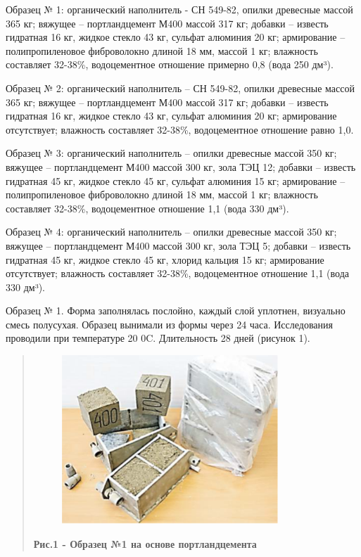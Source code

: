 Образец № 1: органический наполнитель - СН 549-82, опилки древесные
массой 365 кг; вяжущее -- портландцемент М400 массой 317 кг; добавки --
известь гидратная 16 кг, жидкое стекло 43 кг, сульфат алюминия 20 кг;
армирование -- полипропиленовое фиброволокно длиной 18 мм, массой 1 кг;
влажность составляет 32-38\%, водоцементное отношение примерно 0,8 (вода
250 дм³).

Образец № 2: органический наполнитель -- СН 549-82, опилки древесные
массой 365 кг; вяжущее -- портландцемент М400 массой 317 кг; добавки --
известь гидратная 16 кг, жидкое стекло 43 кг, сульфат алюминия 20 кг;
армирование отсутствует; влажность составляет 32-38\%, водоцементное
отношение равно 1,0.

Образец № 3: органический наполнитель -- опилки древесные массой 350 кг;
вяжущее -- портландцемент М400 массой 300 кг, зола ТЭЦ 12; добавки --
известь гидратная 45 кг, жидкое стекло 45 кг, сульфат алюминия 15 кг;
армирование -- полипропиленовое фиброволокно длиной 18 мм, массой 1 кг;
влажность составляет 32-38\%, водоцементное отношение 1,1 (вода 330
дм³).

Образец № 4: органический наполнитель -- опилки древесные массой 350 кг;
вяжущее -- портландцемент М400 массой 300 кг, зола ТЭЦ 5; добавки --
известь гидратная 45 кг, жидкое стекло 45 кг, хлорид кальция 15 кг;
армирование отсутствует; влажность составляет 32-38\%, водоцементное
отношение 1,1 (вода 330 дм³).

Образец № 1. Форма заполнялась послойно, каждый слой уплотнен, визуально
смесь полусухая. Образец вынимали из формы через 24 часа. Исследования
проводили при температуре 20 0C. Длительность 28 дней (рисунок 1).

\begin{quote}

\begin{figure}[H]
	\centering
	\includegraphics[width=0.8\textwidth]{media/chem2/image2}
	\caption*{}
\end{figure}


{\bfseries Рис.1 - Образец №1 на основе портландцемента}
\end{quote}


